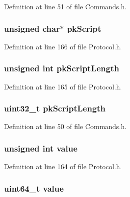 Definition at line 51 of file Commands.h.

\hypertarget{struct_tranx_out_a1065be8e3e985afe6b60c410ca157d61}{
\subsubsection[{pkScript}]{\setlength{\rightskip}{0pt plus 5cm}unsigned char$\ast$ {\bf pkScript}}}
\label{struct_tranx_out_a1065be8e3e985afe6b60c410ca157d61}


Definition at line 166 of file Protocol.h.

\hypertarget{struct_tranx_out_a12d43c2eb75d61a2698e5c78f2f6122c}{
\subsubsection[{pkScriptLength}]{\setlength{\rightskip}{0pt plus 5cm}unsigned int {\bf pkScriptLength}}}
\label{struct_tranx_out_a12d43c2eb75d61a2698e5c78f2f6122c}


Definition at line 165 of file Protocol.h.

\hypertarget{struct_tranx_out_a895859eb7d18cd9b6cb38c25ced2418e}{
\subsubsection[{pkScriptLength}]{\setlength{\rightskip}{0pt plus 5cm}uint32\_\-t {\bf pkScriptLength}}}
\label{struct_tranx_out_a895859eb7d18cd9b6cb38c25ced2418e}


Definition at line 50 of file Commands.h.

\hypertarget{struct_tranx_out_a2a5a27690c40c531d0a8385dc4f66a95}{
\subsubsection[{value}]{\setlength{\rightskip}{0pt plus 5cm}unsigned int {\bf value}}}
\label{struct_tranx_out_a2a5a27690c40c531d0a8385dc4f66a95}


Definition at line 164 of file Protocol.h.

\hypertarget{struct_tranx_out_a4e630859cc0e2a22bd6acf39a6a8e218}{
\subsubsection[{value}]{\setlength{\rightskip}{0pt plus 5cm}uint64\_\-t {\bf value}}}
\label{struct_tranx_out_a4e630859cc0e2a22bd6acf39a6a8e218}


